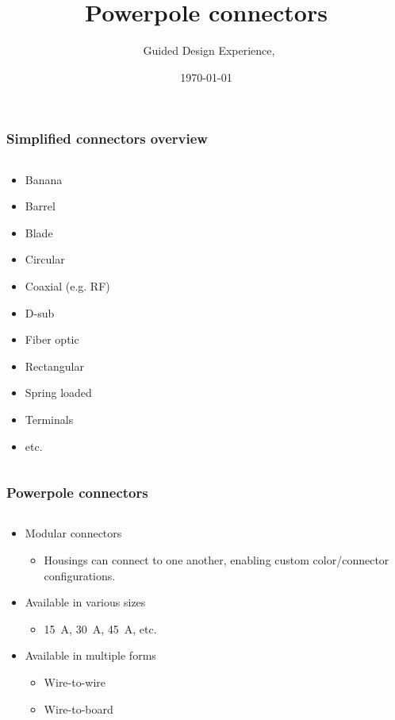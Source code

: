 \documentclass[aspectratio=169]{beamer}
\title{Powerpole connectors}
\subtitle{\usnaCourseNumber\ Guided Design Experience, \usnaCourseTerm}
\author{\usnaInstructorShort}
\date{\today}
\begin{document}
\settitlebg
\begin{frame}
\titlepage
\end{frame}

\setslidebg
\begin{frame}
\frametitle{Simplified connectors overview}
\begin{columns}
\begin{column}{0.33\textwidth}
\begin{itemize}
\item Banana 
\item Barrel 
\item Blade
\item Circular
\item Coaxial (e.g. RF)
\item D-sub
\item Fiber optic
\item Rectangular
\item Spring loaded
\item Terminals
\item etc.
\end{itemize}
\end{column}
\begin{column}{0.66\textwidth}
\end{column}
\end{columns}
\end{frame}

\begin{frame}
\frametitle{Powerpole connectors}
\begin{columns}
\begin{column}{0.5\textwidth}
\begin{itemize}
\item Modular connectors
\begin{itemize}
\item Housings can connect to one another, enabling custom color/connector configurations.
\end{itemize}
\item Available in various sizes
\begin{itemize}
\item \SI{15}{\ampere}, \SI{30}{\ampere}, \SI{45}{\ampere}, etc.
\end{itemize}
\item Available in multiple forms
\begin{itemize}
\item Wire-to-wire
\item Wire-to-board
\end{itemize}
\end{itemize}
\end{column}
\begin{column}{0.5\textwidth}
\end{column}
\end{columns}
\end{frame}
\end{document}
